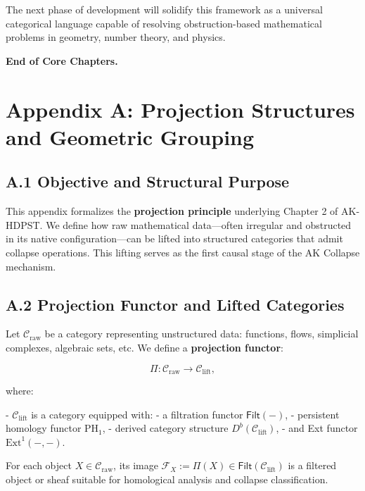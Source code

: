 \documentclass[11pt]{article}
\begin{document}
The next phase of development will solidify this framework as a universal categorical language  
capable of resolving obstruction-based mathematical problems in geometry, number theory, and physics.

\vspace{1em}
\noindent\textbf{End of Core Chapters.}





\appendix
\section*{Appendix A: Projection Structures and Geometric Grouping}

\subsection*{A.1 Objective and Structural Purpose}

This appendix formalizes the \textbf{projection principle} underlying Chapter 2 of AK-HDPST.  
We define how raw mathematical data—often irregular and obstructed in its native configuration—can be lifted into structured categories that admit collapse operations. This lifting serves as the first causal stage of the AK Collapse mechanism.

\subsection*{A.2 Projection Functor and Lifted Categories}

Let \( \mathcal{C}_{\mathrm{raw}} \) be a category representing unstructured data:  
functions, flows, simplicial complexes, algebraic sets, etc.  
We define a \textbf{projection functor}:

\[
\Pi: \mathcal{C}_{\mathrm{raw}} \longrightarrow \mathcal{C}_{\mathrm{lift}},
\]

where:

- \( \mathcal{C}_{\mathrm{lift}} \) is a category equipped with:
  - a filtration functor \( \mathsf{Filt}(-) \),
  - persistent homology functor \( \mathrm{PH}_1 \),
  - derived category structure \( D^b(\mathcal{C}_{\mathrm{lift}}) \),
  - and Ext functor \( \mathrm{Ext}^1(-, -) \).

For each object \( X \in \mathcal{C}_{\mathrm{raw}} \), its image \( \mathcal{F}_X := \Pi(X) \in \mathsf{Filt}(\mathcal{C}_{\mathrm{lift}}) \) is a filtered object or sheaf suitable for homological analysis and collapse classification.
\end{document}
